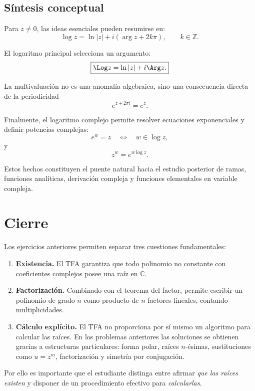 \documentclass[12pt]{article}
\theoremstyle{definition}
\theoremstyle{remark}
\newcommand{\C}{\mathbb{C}}
\begin{document}
\subsection{Síntesis conceptual}

Para $z\neq0$, las ideas esenciales pueden resumirse en:
\[
\boxed{
\log z=\ln|z|+i(\arg z+2k\pi),\qquad k\in\mathbb Z.
}
\]

El logaritmo principal selecciona un argumento:
\[
\boxed{
\Log z=\ln|z|+i\Arg z.
}
\]

La multivaluación no es una anomalía algebraica, sino una consecuencia directa
de la periodicidad
\[
e^{z+2\pi i}=e^z.
\]

Finalmente, el logaritmo complejo permite resolver ecuaciones exponenciales y
definir potencias complejas:
\[
e^w=z
\quad\Longleftrightarrow\quad
w\in\log z,
\]
y
\[
z^w=e^{w\log z}.
\]

Estos hechos constituyen el puente natural hacia el estudio posterior de
ramas, funciones analíticas, derivación compleja y funciones elementales en
variable compleja.


\section{Cierre}

Los ejercicios anteriores permiten separar tres cuestiones fundamentales:

\begin{enumerate}
\item \textbf{Existencia.} El TFA garantiza que todo polinomio no constante
con coeficientes complejos posee una raíz en $\C$.

\item \textbf{Factorización.} Combinado con el teorema del factor, permite
escribir un polinomio de grado $n$ como producto de $n$ factores lineales,
contando multiplicidades.

\item \textbf{Cálculo explícito.} El TFA no proporciona por sí mismo un
algoritmo para calcular las raíces. En los problemas anteriores las soluciones
se obtienen gracias a estructuras particulares: forma polar, raíces
$n$-ésimas, sustituciones como $u=z^m$, factorización y simetría por
conjugación.
\end{enumerate}

Por ello es importante que el estudiante distinga entre afirmar
\emph{que las raíces existen} y disponer de un procedimiento efectivo para
\emph{calcularlas}.
\end{document}
